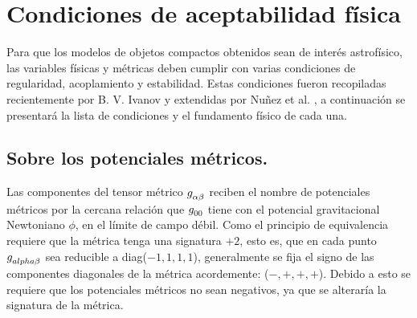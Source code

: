 




\section{Condiciones de aceptabilidad física}\label{phyacep}
\noindent Para que los modelos de objetos compactos obtenidos sean de interés astrofísico, las variables físicas y métricas deben cumplir con varias condiciones de regularidad, acoplamiento y estabilidad. Estas condiciones fueron recopiladas recientemente por B. V. Ivanov \cite{Ivanov2017} y extendidas por Nuñez et al. \cite{Hernandez2018}, a continuación se presentará la lista de condiciones y el fundamento físico de cada una.

\subsection*{Sobre los potenciales métricos.}
\noindent Las componentes del tensor métrico $\tensor{g}{_\alpha_\beta}$ reciben el nombre de potenciales métricos por la cercana relación que $\tensor{g}{_0_0}$ tiene con el potencial gravitacional Newtoniano $\phi$, en el límite de campo débil. Como el principio de equivalencia requiere que la métrica tenga una signatura $+2$, esto es, que en cada punto $\tensor{g}{_{alpha}_{\beta}}$ sea reducible a diag($-1,1,1,1$), generalmente se fija el signo de las componentes diagonales de la métrica acordemente: ($-, +, +, +$). Debido a esto se requiere que los potenciales métricos no sean negativos, ya que se alteraría la signatura de la métrica.

